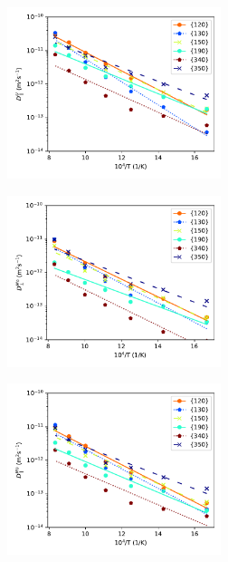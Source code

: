 \documentclass{elsarticle}
\providecommand{\DIFdel}[1]{}
\providecommand{\DIFdelFL}[1]{\DIFdel{#1}} %
\providecommand{\DIFaddbeginFL}{} %
\providecommand{\DIFaddendFL}{} %
\providecommand{\DIFdelbeginFL}{} %
\providecommand{\DIFdelendFL}{} %
\begin{document}
\begin{figure}[!ht]
\DIFdelendFL \DIFaddbeginFL \begin{subfigure}{0.45\textwidth}
	\DIFaddendFL \centering
	\caption{}
	\DIFdelbeginFL %
\DIFdelendFL \DIFaddbeginFL \includegraphics[height=5cm]{u10mo_U_Dz.pdf}
\DIFaddendFL \end{subfigure}
\DIFaddbeginFL \begin{subfigure}{0.45\textwidth}
	\centering
	\DIFaddendFL \caption{\DIFdelbeginFL \DIFdelFL{Total diffusivity in (a) symmetric tilt grain boundaries and (b) asymmetric tilt and twist grain boundaries for $\gamma$U-10Mo as a function of inverse temperature. Solid and dashed lines are Arrhenius fits to the data points.}\DIFdelendFL }
	\DIFaddbeginFL \includegraphics[height=5cm]{u10mo_Mo_Dx.pdf}
\end{subfigure}
\begin{subfigure}{0.45\textwidth}
	\centering
	\caption{}
	\includegraphics[height=5cm]{u10mo_Mo_Dz.pdf}

\end{subfigure}
\end{figure}
\end{document}
